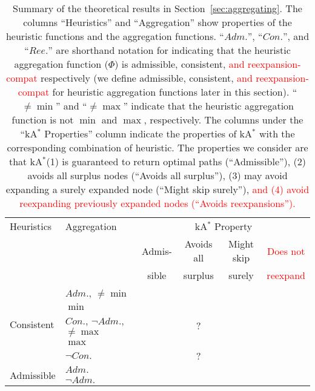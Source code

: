 \documentclass[smallextended]{svjour3}       %
\newcommand{\cmark}{\textcolor{green}{\ding{51}}}
\newcommand{\xmark}{\textcolor{red}{\ding{55}}}
\newcommand{\kastar}{kA$^*$\xspace}
\newcommand{\axiomadm}{admissible\xspace}
\newcommand{\axiomcons}{consistent\xspace}
\newcommand{\axiomreexp}{reexpansion-compat\xspace}
\newcommand{\shortadm}{\mathit{Adm.}}
\newcommand{\shortcon}{\mathit{Con.}}
\newcommand{\shortree}{\mathit{Ree.}}
\begin{document}
\begin{table}
\centering
\begin{tabular}{ll*4{c}}
\toprule
Heuristics & Aggregation & \multicolumn{4}{c}{\kastar Property}\\
\cmidrule{3-6}
 & & \multirow{1}{*}{Admis-} & Avoids all & Might skip & \textcolor{red}{Does not} \\
 & & sible & surplus & surely & \textcolor{red}{reexpand}\\
\midrule
\multirow{5}{*}{Consistent}
& $\shortadm$, $\neq \min$ & \cmark & \xmark & \xmark & \\
& $\min$ &  \cmark & \cmark & \xmark & \cmark\\
& $\shortcon$, $\neg \shortadm$, $\neq \max$ & \cmark & ? & \cmark & \\
& $\max$ &  \cmark & \xmark & \cmark & \cmark\\
& $\neg \shortcon$ & \xmark & ? & \cmark & \xmark\\
\midrule
\multirow{2}{*}{Admissible}
& $\shortadm$ & \cmark & \xmark & \xmark & \xmark\\
& $\neg \shortadm$ & \xmark & \xmark & \cmark & \xmark\\
\bottomrule
\end{tabular}
\caption{Summary of the theoretical results in Section~\ref{sec:aggregating}. 
The columns ``Heuristics'' and ``Aggregation'' show properties of the heuristic functions and the aggregation functions. 
``$\shortadm$'', ``$\shortcon$'', and ``$\shortree$'' are shorthand notation for indicating that the heuristic aggregation function ($\Phi$) is \axiomadm, \axiomcons, \textcolor{red}{and \axiomreexp} respectively (we define \axiomadm, \axiomcons, \textcolor{red}{and \axiomreexp} for heuristic aggregation functions later in this section).
``$\neq \min$'' and ``$\neq \max$'' indicate that the heuristic aggregation function is not $\min$ and $\max$, respectively. 
The columns under the ``\kastar Properties'' column indicate the properties of \kastar with the corresponding combination of heuristic. The properties we consider are that \kastar (1) is guaranteed to return optimal paths (``Admissible''), (2) avoids all surplus nodes (``Avoids all surplus''), (3) may avoid expanding a surely expanded node (``Might skip surely''), \textcolor{red}{and (4) avoid reexpanding previously expanded nodes (``Avoids reexpansions'').}}
\label{tab:summary}
\end{table}
\end{document}
